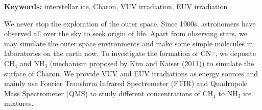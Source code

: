 \begin{abstracten}

{\bf \sf Keywords:} interstellar ice, Charon, VUV irradiation, EUV irradiation

\vspace{2em}

We never stop the exploration of the outer space. Since 1900s, astronomers have observed all over the sky to seek origin of life. Apart from observing stars, we may simulate the outer space environments and make some simple molecules in laboratories on the earth now. To investigate the formation of CN$^-$, we deposite CH$_4$ and NH$_3$ (mechanism proposed by Kim and Kaiser (2011)\cite{kim}) to simulate the surface of Charon. We provide VUV and EUV irradiations as energy sources and mainly use Fourier Transform Infrared Spectrometer (FTIR) and Quadrupole Mass Spectrometer (QMS) to study different concentrations of CH$_4$ to NH$_3$ ice mixtures.

\end{abstracten} 

